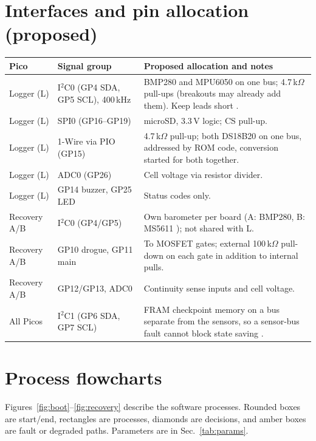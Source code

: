 \section{Interfaces and pin allocation (proposed)}
\small
{}
\begin{tabularx}{\linewidth}{@{}L{22mm}L{40mm}Y@{}}
\toprule{}\textbf{Pico}&\textbf{Signal group}&\textbf{Proposed allocation and notes}\\\midrule
Logger (L) & I$^2$C0 (GP4 SDA, GP5 SCL), 400\,kHz & BMP280 and MPU6050 on one bus; 4.7\,k$\Omega$ pull-ups (breakouts may already add them). Keep leads short \cite{i2cspec}.\\
Logger (L) & SPI0 (GP16--GP19) & microSD, 3.3\,V logic; CS pull-up.\\
Logger (L) & 1-Wire via PIO (GP15) & 4.7\,k$\Omega$ pull-up; both DS18B20 on one bus, addressed by ROM code, conversion started for both together.\\
Logger (L) & ADC0 (GP26) & Cell voltage via resistor divider.\\
Logger (L) & GP14 buzzer, GP25 LED & Status codes only.\\
Recovery A/B & I$^2$C0 (GP4/GP5) & Own barometer per board (A: BMP280, B: MS5611 \cite{ms5611ds}); not shared with L.\\
Recovery A/B & GP10 drogue, GP11 main & To MOSFET gates; external 100\,k$\Omega$ pull-down on each gate in addition to internal pulls.\\
Recovery A/B & GP12/GP13, ADC0 & Continuity sense inputs and cell voltage.\\
All Picos & I$^2$C1 (GP6 SDA, GP7 SCL) & FRAM checkpoint memory on a bus separate from the sensors, so a sensor-bus fault cannot block state saving \cite{fram}.\\
\bottomrule
\end{tabularx}
\normalsize

\section{Process flowcharts}\label{sec:flowcharts}
Figures~\ref{fig:boot}--\ref{fig:recovery} describe the software processes. Rounded boxes are start/end, rectangles are processes, diamonds are decisions, and amber boxes are fault or degraded paths. Parameters are in Sec.~\ref{tab:params}.

